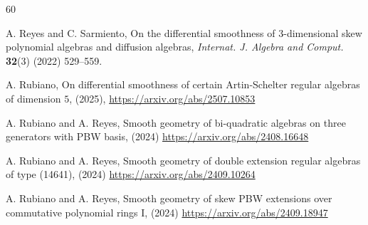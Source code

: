 \documentclass{amsart}
\theoremstyle{definition}
\theoremstyle{remark}
\numberwithin{equation}{section}
\begin{document}
\begin{thebibliography}{60}




 A. Reyes and C. Sarmiento, On the differential smoothness of 3-dimensional skew polynomial algebras and diffusion algebras, {\em Internat. J. Algebra and Comput.} {\bf 32}(3) (2022) 529--559.



 A. Rubiano, On differential smoothness of certain Artin-Schelter regular algebras of dimension $5$, (2025), \url{https://arxiv.org/abs/2507.10853}

 A. Rubiano and A. Reyes, Smooth geometry of bi-quadratic algebras on three generators with PBW basis, (2024) \url{https://arxiv.org/abs/2408.16648}

 A. Rubiano and A. Reyes, Smooth geometry of double extension regular algebras of type (14641), (2024) \url{https://arxiv.org/abs/2409.10264}

 A. Rubiano and A. Reyes, Smooth geometry of skew PBW extensions over commutative polynomial rings I, (2024) \url{https://arxiv.org/abs/2409.18947}


\end{thebibliography}
\end{document}

